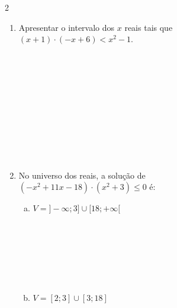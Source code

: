 \documentclass[a4paper,14pt]{article}
\begin{document}
\begin{multicols}{2}
\begin{enumerate}
\begin{enumerate}[a)]
    			\item $-x(x^2 + 8)(-x^2 + 9x - 20)\\(x - 1)(-x^2 + 5x) \geq 0$
    			\\\\\\\\\\\\\\\\\\\\
    			\item $x^2(x^2 - 2)(x + 1)\\(x^2 + 5x - 6) \leq 0$
    			\\\\\\\\\\\\\\\\\\\\\\\\
    		\end{enumerate}
    		\item Apresentar o intervalo dos $x$ reais tais que \\
    		$(x + 1) \cdot (-x + 6) < x^2 - 1$.
    		\\\\\\\\\\\\\\\\\\\\\\
    		\item No universo dos reais, a solução de \\
    		$(-x^2 + 11x - 18) \cdot (x^2 + 3) \leq 0$ é:
    		\begin{enumerate}[a)]
    			\item $V = ]-\infty; 3] \cup [18; +\infty[$ 
    			\\\\\\\\\\\\\\
    			\item $V = [2; 3] \cup [3; 18]$

\end{enumerate}
\end{enumerate}
\end{multicols}
\end{document}
